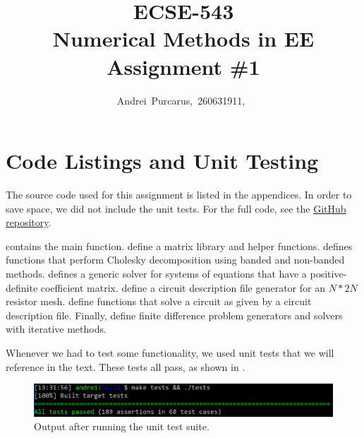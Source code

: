 \documentclass[journal,hidelinks]{IEEEtran}
\title{ECSE-543 \\ Numerical Methods in EE \\ Assignment \#1}
\author{Andrei~Purcarus,~260631911,~\IEEEmembership{McGill~University}}
\begin{document}
\sloppy

\maketitle






\section*{Code Listings and Unit Testing}

The source code used for this assignment is listed in the appendices. In order to save space, we did not include the unit tests. For the full code, see the \href{https://github.com/Gripnook/ECSE543-F17-A1}{GitHub repository}.

 contains the main function.  define a matrix library and helper functions.  defines functions that perform Cholesky decomposition using banded and non-banded methods.  defines a generic solver for systems of equations that have a positive-definite coefficient matrix.  define a circuit description file generator for an $N * 2N$ resistor mesh.  define functions that solve a circuit as given by a circuit description file. Finally,  define finite difference problem generators and solvers with iterative methods.

Whenever we had to test some functionality, we used unit tests that we will reference in the text. These tests all pass, as shown in .

\begin{figure}[!htb]
  \centering
  \includegraphics[width=\columnwidth]{test-output.png}
  \caption{Output after running the unit test suite.}
  \label{fig:test-output}
\end{figure}
\end{document}
